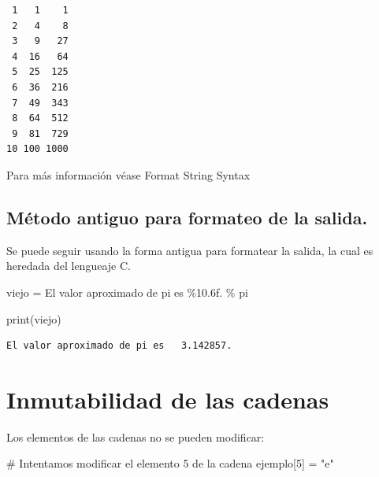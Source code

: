 \documentclass[
  spanish,
  letterpaper,
]{scrbook}
\newenvironment{Shaded}{\begin{snugshade}}{\end{snugshade}}
\newcommand{\BuiltInTok}[1]{\textcolor[rgb]{0.00,0.23,0.31}{#1}}
\newcommand{\CommentTok}[1]{\textcolor[rgb]{0.37,0.37,0.37}{#1}}
\newcommand{\DecValTok}[1]{\textcolor[rgb]{0.68,0.00,0.00}{#1}}
\newcommand{\NormalTok}[1]{\textcolor[rgb]{0.00,0.23,0.31}{#1}}
\newcommand{\OperatorTok}[1]{\textcolor[rgb]{0.37,0.37,0.37}{#1}}
\newcommand{\SpecialCharTok}[1]{\textcolor[rgb]{0.37,0.37,0.37}{#1}}
\newcommand{\StringTok}[1]{\textcolor[rgb]{0.13,0.47,0.30}{#1}}
\theoremstyle{definition}
\theoremstyle{remark}
\begin{document}
\begin{verbatim}
 1   1    1
 2   4    8
 3   9   27
 4  16   64
 5  25  125
 6  36  216
 7  49  343
 8  64  512
 9  81  729
10 100 1000
\end{verbatim}

Para más información véase Format String Syntax

\subsection{Método antiguo para formateo de la
salida.}\label{muxe9todo-antiguo-para-formateo-de-la-salida.}

Se puede seguir usando la forma antigua para formatear la salida, la
cual es heredada del lengueaje C.

\begin{Shaded}
\begin{Highlighting}[]
\NormalTok{viejo }\OperatorTok{=} \StringTok{\textquotesingle{}El valor aproximado de pi es }\SpecialCharTok{\%10.6f}\StringTok{.\textquotesingle{}} \OperatorTok{\%}\NormalTok{ pi}

\BuiltInTok{print}\NormalTok{(viejo)}
\end{Highlighting}
\end{Shaded}

\begin{verbatim}
El valor aproximado de pi es   3.142857.
\end{verbatim}

\section{Inmutabilidad de las
cadenas}\label{inmutabilidad-de-las-cadenas}

Los elementos de las cadenas no se pueden modificar:

\begin{Shaded}
\begin{Highlighting}[]
\CommentTok{\# Intentamos modificar el elemento 5 de la cadena}
\NormalTok{ejemplo[}\DecValTok{5}\NormalTok{] }\OperatorTok{=} \StringTok{"e"}
\end{Highlighting}
\end{Shaded}
\end{document}
